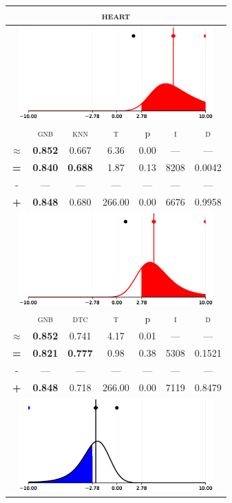 \begin{tabular}{c||cc||c|c|c||c}
	\toprule
	\multicolumn{7}{c}{\textsc{heart}}\\
	\bottomrule
	\multicolumn{7}{c}{\includegraphics[width=7.5cm, trim=30 0 30 0]{figures/heart_0.eps}}\\

\midrule	&\textsc{gnb} & \textsc{knn} & \textsc{t} & p & \textsc{i} & \textsc{d}\\
	\color{red} $\approx$ & \color{red} \bfseries 0.852 &\color{red}   0.667 & 6.36 & 0.00 & --- & ---\\\midrule
	{\bfseries\color{black}\tiny=}& \color{black} \bfseries 0.840 & \color{black} \bfseries 0.688 & 1.87 & 0.13 & 8208 & \color{black} 0.0042\\
	{\tiny-}& --- & --- & --- & --- & --- & ---\\
	{\bfseries\color{red}\tiny+}& \color{red} \bfseries 0.848 & \color{red}  0.680 & 266.00 & 0.00 & 6676 & \color{red} 0.9958\\
	\bottomrule
	\multicolumn{7}{c}{\includegraphics[width=7.5cm, trim=30 0 30 0]{figures/heart_1.eps}}\\

\midrule	&\textsc{gnb} & \textsc{dtc} & \textsc{t} & p & \textsc{i} & \textsc{d}\\
	\color{red} $\approx$ & \color{red} \bfseries 0.852 &\color{red}   0.741 & 4.17 & 0.01 & --- & ---\\\midrule
	{\bfseries\color{black}\tiny=}& \color{black} \bfseries 0.821 & \color{black} \bfseries 0.777 & 0.98 & 0.38 & 5308 & \color{black} 0.1521\\
	{\tiny-}& --- & --- & --- & --- & --- & ---\\
	{\bfseries\color{red}\tiny+}& \color{red} \bfseries 0.848 & \color{red}  0.718 & 266.00 & 0.00 & 7119 & \color{red} 0.8479\\
	\bottomrule
	\multicolumn{7}{c}{\includegraphics[width=7.5cm, trim=30 0 30 0]{figures/heart_2.eps}}\\


\end{tabular}
